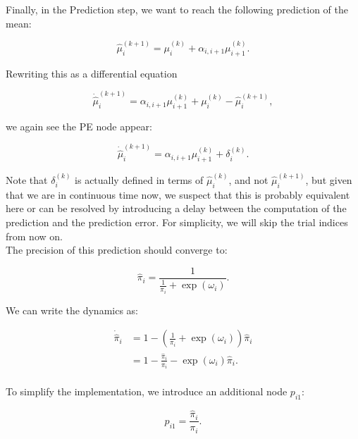 Finally, in the \textsf{Prediction} step, we want to reach the following prediction of the mean:

\begin{equation}
	\hat{\mu}_i^{(k+1)} = \mu_i^{(k)} + \alpha_{i,i+1} \mu_{i+1}^{(k)}.
\end{equation}

Rewriting this as a differential equation

\begin{equation}
	\dot{\hat{\mu}}_i^{(k+1)} = \alpha_{i,i+1} \mu_{i+1}^{(k)} + \mu_i^{(k)} - \hat{\mu}_i^{(k+1)}, 
\end{equation}

we again see the \textsf{PE} node appear:

\begin{equation}
	\dot{\hat{\mu}}_i^{(k+1)} = \alpha_{i,i+1} \mu_{i+1}^{(k)} + \delta_i^{(k)}. 
\end{equation}

Note that $\delta_i^{(k)}$ is actually defined in terms of $\hat{\mu}_i^{(k)}$, and not $\hat{\mu}_i^{(k+1)}$, but given that we are in continuous time now, we suspect that this is probably equivalent here or can be resolved by introducing a delay between the computation of the prediction and the prediction error. For simplicity, we will skip the trial indices from now on. \\

The precision of this prediction should converge to:

\begin{equation}
	\hat{\pi}_i = \frac{1}{\frac{1}{\pi_i} + \exp(\omega_i)}.
\end{equation}

We can write the dynamics as:

\begin{equation}
	\begin{split}
		\dot{\hat{\pi}}_i &= 1 - (\frac{1}{\pi_i} + \exp(\omega_i)) \hat{\pi}_i\\
		&= 1 - \frac{\hat{\pi}_i}{\pi_i} - \exp(\omega_i) \hat{\pi}_i.\\
	\end{split}
\end{equation}

To simplify the implementation, we introduce an additional node $p_{i1}$:

\begin{equation}
	p_{i1} = \frac{\hat{\pi}_i}{\pi_i}.
\end{equation}


